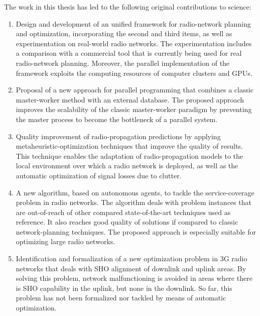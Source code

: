 The work in this thesis has led to the following original contributions
to science:
\begin{enumerate}
\item Design and development of an unified framework for radio-network planning
and optimization, incorporating the second and third items, as well
as experimentation on real-world radio networks. The experimentation
includes a comparison with a commercial tool that is currently being
used for real radio-network planning. Moreover, the parallel implementation
of the framework exploits the computing resources of computer clusters
and GPUs.
\item Proposal of a new approach for parallel programming that combines
a classic master-worker method with an external database. The proposed
approach improves the scalability of the classic master-worker paradigm
by preventing the master process to become the bottleneck of a parallel
system.
\item Quality improvement of radio-propagation predictions by applying metaheuristic-optimization
techniques that improve the quality of results. This technique enables
the adaptation of radio-propagation models to the local environment
over which a radio network is deployed, as well as the automatic optimization
of signal losses due to clutter.
\item A new algorithm, based on autonomous agents, to tackle the service-coverage
problem in radio networks. The algorithm deals with problem instances
that are out-of-reach of other compared state-of-the-art techniques
used as reference. It also reaches good quality of solutions if compared
to classic network-planning techniques. The proposed approach is especially
suitable for optimizing large radio networks.
\item Identification and formalization of a new optimization problem in
3G radio networks that deals with SHO alignment of downlink and uplink
areas. By solving this problem, network malfunctioning is avoided
in areas where there is SHO capability in the uplink, but none in
the downlink. So far, this problem has not been formalized nor tackled
by means of automatic optimization.\end{enumerate}

